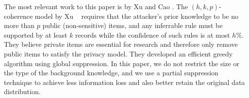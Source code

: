 The most relevant work to this paper is by Xu \etal \cite{Xu:2008:ATD} and
Cao \etal \cite{Cao:2010:rho}. The $(h,k,p)$-coherence model by Xu \etal~
requires that the attacker's prior knowledge to be no more than $p$ public
(non-sensitive) items, and any inferrable rule must be supported by at least
$k$ records while the confidence of such rules is at most $h$\%. They believe
private items are essential for research and therefore only remove public
items to satisfy the privacy model. They developed an efficient greedy
algorithm using global suppression. In this paper, we do not restrict the
size or the type of the background knowledge, and we use a partial
suppression technique to achieve less information loss and also better retain
the original data distribution.
%



